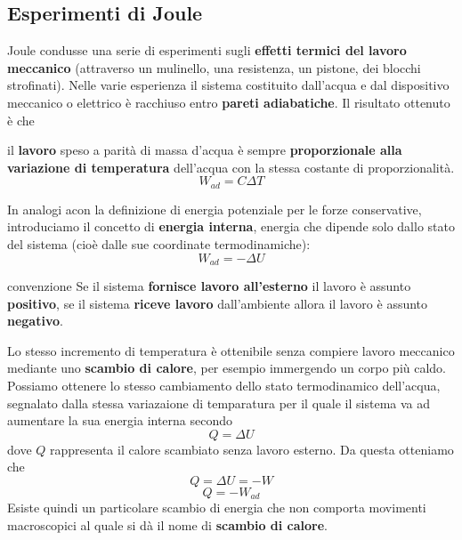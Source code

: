 \documentclass[x11names]{article}
\begin{document}
	
	\subsection{Esperimenti di Joule}
	Joule condusse una serie di esperimenti sugli\textbf{ effetti termici del lavoro meccanico} (attraverso un mulinello, una resistenza, un pistone, dei blocchi strofinati). Nelle varie esperienza il sistema costituito dall'acqua e dal dispositivo meccanico o elettrico è racchiuso entro \textbf{pareti adiabatiche}. Il risultato ottenuto è che 
	
	\begin{center}
		il \textbf{lavoro}  speso a parità di massa d'acqua è sempre \textbf{proporzionale alla variazione di temperatura} dell'acqua con la stessa costante di proporzionalità.
		\[ 
		W_{ad} = C\Delta T
		\]
	\end{center}
	In analogi acon la definizione di energia potenziale per le forze conservative, introduciamo il concetto di \textbf{energia interna}, energia che dipende solo dallo stato del sistema (cioè dalle sue coordinate termodinamiche):
	\[ 
	W_{ad} = -\Delta U 
	\]
	\begin{es}{convenzione}
		Se il sistema \textbf{fornisce lavoro all'esterno} il lavoro è assunto \textbf{positivo}, se il sistema \textbf{riceve lavoro} dall'ambiente allora il lavoro è assunto \textbf{negativo}.
	\end{es}
	Lo stesso incremento di temperatura è ottenibile senza compiere lavoro meccanico mediante uno \textbf{scambio di calore}, per esempio immergendo un corpo più caldo. Possiamo ottenere lo stesso cambiamento dello stato termodinamico dell'acqua, segnalato dalla stessa variazaione di temparatura per il quale il sistema va ad aumentare la sua energia interna secondo
	\[ 
	Q = \Delta U
	\]
	dove \(Q\) rappresenta il calore scambiato senza lavoro esterno. Da questa otteniamo che 
	\[ 
	Q = \Delta U = -W
	\]
	\begin{equation}\label{Mayer}
		Q = -W_{ad}
	\end{equation}
	Esiste quindi un particolare scambio di energia che non comporta movimenti macroscopici al quale si dà il nome di \textbf{scambio di calore}.
	
\end{document}
